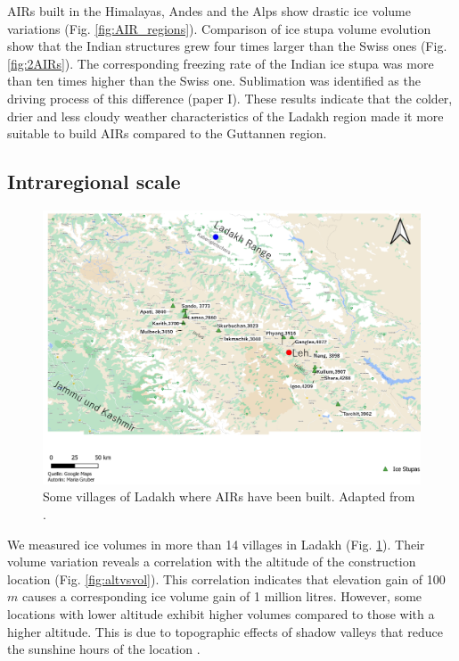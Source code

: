 AIRs built in the Himalayas, Andes and the Alps show drastic ice volume variations (Fig. \ref{fig:AIR_regions}).
Comparison of ice stupa volume evolution show that the Indian structures grew four times larger than the Swiss ones (Fig.
\ref{fig:2AIRs}). The corresponding freezing rate of the Indian ice stupa was more than ten times higher than
the Swiss one. Sublimation was identified as the driving process of this difference (paper I). These results indicate that the
colder, drier and less cloudy weather characteristics of the Ladakh region made it more suitable to build AIRs
compared to the Guttannen region. 

\subsection{Intraregional scale}

\begin{figure}[htb]
	\includegraphics[width=\textwidth]{figs/ISC_villages}
  \caption{Some villages of Ladakh where AIRs have been built. Adapted from \citet{mariagruberIceStupasLadakh2022}.}
	\label{fig:villages}
\end{figure}

We measured ice volumes in more than 14 villages in Ladakh (Fig. \ref{fig:villages}). Their volume variation
reveals a correlation with the altitude of the construction location (Fig. \ref{fig:altvsvol}). This correlation
indicates that elevation gain of 100 $m$ causes a corresponding ice volume gain of 1 million litres. However,
some locations with lower altitude exhibit higher volumes compared to those with a higher altitude. This is due
to topographic effects of shadow valleys that reduce the sunshine hours of the location
\citep{mariagruberIceStupasLadakh2022}.

